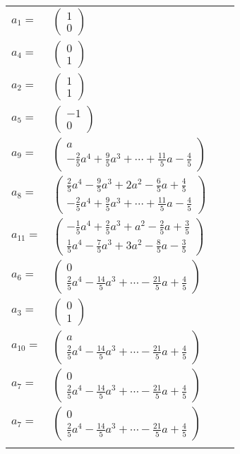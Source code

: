 \documentclass[1p]{elsarticle_modified}
\theoremstyle{definition}
\begin{document}
\begin{tabular}{m{7pt} m{180pt} m{7pt} m{180pt} }
\flushright $a_{1}=$&$\begin{pmatrix}1\\0\end{pmatrix}$ \\
\flushright $a_{4}=$&$\begin{pmatrix}0\\1\end{pmatrix}$ \\
\flushright $a_{2}=$&$\begin{pmatrix}1\\1\end{pmatrix}$ \\
\flushright $a_{5}=$&$\begin{pmatrix}-1\\0\end{pmatrix}$ \\
\flushright $a_{9}=$&$\begin{pmatrix}a\\-\frac{2}{5} a^4+\frac{9}{5} a^3+\cdots+\frac{11}{5} a-\frac{4}{5}\end{pmatrix}$ \\
\flushright $a_{8}=$&$\begin{pmatrix}\frac{2}{5} a^4-\frac{9}{5} a^3+2 a^2-\frac{6}{5} a+\frac{4}{5}\\-\frac{2}{5} a^4+\frac{9}{5} a^3+\cdots+\frac{11}{5} a-\frac{4}{5}\end{pmatrix}$ \\
\flushright $a_{11}=$&$\begin{pmatrix}-\frac{1}{5} a^4+\frac{2}{5} a^3+a^2-\frac{2}{5} a+\frac{3}{5}\\\frac{1}{5} a^4-\frac{7}{5} a^3+3 a^2-\frac{8}{5} a-\frac{3}{5}\end{pmatrix}$ \\
\flushright $a_{6}=$&$\begin{pmatrix}0\\\frac{2}{5} a^4-\frac{14}{5} a^3+\cdots-\frac{21}{5} a+\frac{4}{5}\end{pmatrix}$ \\
\flushright $a_{3}=$&$\begin{pmatrix}0\\1\end{pmatrix}$ \\
\flushright $a_{10}=$&$\begin{pmatrix}a\\\frac{2}{5} a^4-\frac{14}{5} a^3+\cdots-\frac{21}{5} a+\frac{4}{5}\end{pmatrix}$ \\
\flushright $a_{7}=$&$\begin{pmatrix}0\\\frac{2}{5} a^4-\frac{14}{5} a^3+\cdots-\frac{21}{5} a+\frac{4}{5}\end{pmatrix}$\\ \flushright $a_{7}=$&$\begin{pmatrix}0\\\frac{2}{5} a^4-\frac{14}{5} a^3+\cdots-\frac{21}{5} a+\frac{4}{5}\end{pmatrix}$\\&\end{tabular}
\end{document}
